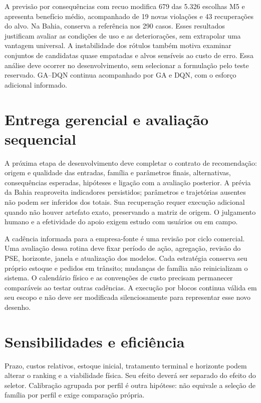 A previsão por consequências com recuo modifica 679 das 5.326 escolhas M5 e apresenta benefício médio, acompanhado de 19 novas violações e 43 recuperações do alvo. Na Bahia, conserva a referência nos 290 casos. Esses resultados justificam avaliar as condições de uso e as deteriorações, sem extrapolar uma vantagem universal. A instabilidade dos rótulos também motiva examinar conjuntos de candidatas quase empatadas e alvos sensíveis ao custo de erro. Essa análise deve ocorrer no desenvolvimento, sem selecionar a formulação pelo teste reservado. GA--DQN continua acompanhado por GA e DQN, com o esforço adicional informado.

\section{Entrega gerencial e avaliação sequencial}
A próxima etapa de desenvolvimento deve completar o contrato de recomendação: origem e qualidade das entradas, família e parâmetros finais, alternativas, consequências esperadas, hipóteses e ligação com a avaliação posterior. A prévia da Bahia reaproveita indicadores persistidos; parâmetros e trajetórias ausentes não podem ser inferidos dos totais. Sua recuperação requer execução adicional quando não houver artefato exato, preservando a matriz de origem. O julgamento humano e a efetividade do apoio exigem estudo com usuários ou em campo.

A cadência informada para a empresa-fonte é uma revisão por ciclo comercial. Uma avaliação dessa rotina deve fixar período de ação, agregação, revisão do PSE, horizonte, janela e atualização dos modelos. Cada estratégia conserva seu próprio estoque e pedidos em trânsito; mudanças de família não reinicializam o sistema. O calendário físico e as convenções de custo precisam permanecer comparáveis ao testar outras cadências. A execução por blocos continua válida em seu escopo e não deve ser modificada silenciosamente para representar esse novo desenho.

\section{Sensibilidades e eficiência}
\label{sec:robustez_pooling}
Prazo, custos relativos, estoque inicial, tratamento terminal e horizonte podem alterar o ranking e a viabilidade física. Seu efeito deverá ser separado do efeito do seletor. Calibração agrupada por perfil é outra hipótese: não equivale a seleção de família por perfil e exige comparação própria.


